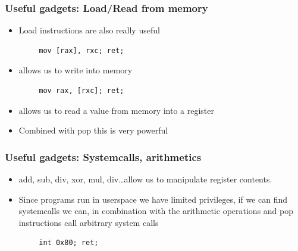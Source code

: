 \documentclass[11pt]{beamer}
\begin{document}
\begin{frame}[fragile]
    \frametitle{Useful gadgets: Load/Read from memory}
    \begin{itemize}
        \item Load instructions are also really useful
    \end{itemize}
    \begin{Verbatim}
        mov [rax], rxc; ret;
    \end{Verbatim}
    \begin{itemize}
        \item allows us to write into memory
    \end{itemize}
    \begin{Verbatim}
        mov rax, [rxc]; ret;
    \end{Verbatim}
    \begin{itemize}
        \item allows us to read a value from memory into a register
        \item Combined with pop this is very powerful
    \end{itemize}
\end{frame}

\begin{frame}[fragile]
    \frametitle{Useful gadgets: Systemcalls, arithmetics}
    \begin{itemize}
        \item add, sub, div, xor, mul, div\ldots allow us to manipulate register contents.
        \item Since programs run in userspace we have limited privileges, if we can find systemcalls we can, in combination with the arithmetic operations and pop instructions call arbitrary system calls
    \end{itemize}
    \begin{Verbatim}
        int 0x80; ret;
    \end{Verbatim}
\end{frame}
\end{document}

